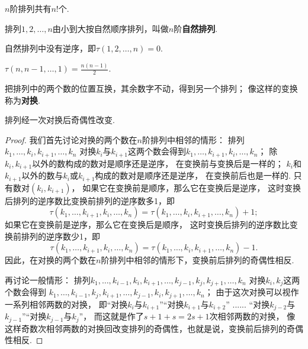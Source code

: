 \begin{property}
\(n\)阶排列共有\(n!\)个.
\end{property}

\begin{definition}
排列\(1,2,\dotsc,n\)由小到大按自然顺序排列，叫做\(n\)阶\textbf{自然排列}.
\end{definition}

\begin{property}
自然排列中没有逆序，即\(\tau(1,2,\dotsc,n)=0\).
\end{property}

\begin{property}
\(\tau(n,n-1,\dotsc,1)=\frac{n(n-1)}{2}\).
\end{property}

\begin{definition}
把排列中的两个数的位置互换，其余数字不动，得到另一个排列；
像这样的变换称为\textbf{对换}.
\end{definition}

\begin{theorem}
排列经一次对换后奇偶性改变.
\begin{proof}
我们首先讨论对换的两个数在\(n\)阶排列中相邻的情形：
排列\(k_1,\dotsc,k_i,k_{i+1},\dotsc,k_n\)
对换\(k_i\)与\(k_{i+1}\)这两个数会得到\(k_1,\dotsc,k_{i+1},k_i,\dotsc,k_n\)；
除\(k_i,k_{i+1}\)以外的数构成的数对是顺序还是逆序，
在变换前与变换后是一样的；
\(k_i\)和\(k_{i+1}\)以外的数与\(k_i\)或\(k_{i+1}\)构成的数对是顺序还是逆序，
在变换前后也是一样的.
只有数对\((k_i,k_{i+1})\)，
如果它在变换前是顺序，那么它在变换后是逆序，
这时变换后排列的逆序数比变换前排列的逆序数多1，即\[
	\tau(k_1,\dotsc,k_{i+1},k_i,\dotsc,k_n)
	= \tau(k_1,\dotsc,k_i,k_{i+1},\dotsc,k_n) + 1;
\]
如果它在变换前是逆序，那么它在变换后是顺序，
这时变换后排列的逆序数比变换前排列的逆序数少1，即\[
	\tau(k_1,\dotsc,k_{i+1},k_i,\dotsc,k_n)
	= \tau(k_1,\dotsc,k_i,k_{i+1},\dotsc,k_n) - 1.
\]
因此，在对换的两个数在\(n\)阶排列中相邻的情形下，变换前后排列的奇偶性相反.

再讨论一般情形：
排列\(k_1,\dotsc,k_{i-1},k_i,k_{i+1},\dotsc,k_{j-1},k_j,k_{j+1},\dotsc,k_n\)
对换\(k_i,k_j\)这两个数会得到
\(k_1,\dotsc,k_{i-1},k_j,k_{i+1},\dotsc,k_{j-1},k_i,k_{j+1},\dotsc,k_n\)；
由于这次对换可以视作一系列相邻两数的对换，
即“对换\(k_i\)与\(k_{i+1}\)”“对换\(k_{i+1}\)与\(k_{i+2}\)”%
......%
“对换\(k_{j-2}\)与\(k_{j-1}\)”“对换\(k_{j-1}\)与\(k_j\)”，
而这就是作了\(s+1+s=2s+1\)次相邻两数的对换，
像这样奇数次相邻两数的对换回改变排列的奇偶性，也就是说，变换前后排列的奇偶性相反.
\end{proof}
\end{theorem}

